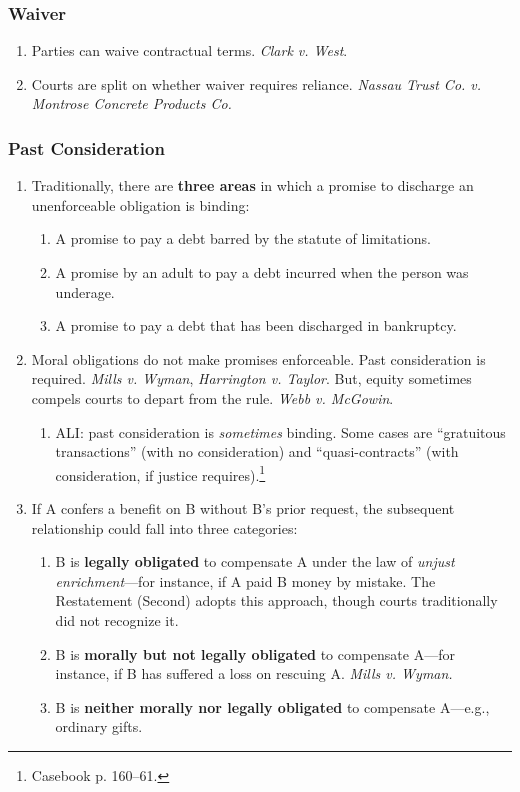 \subsubsection{Waiver}

\begin{enumerate}
    \item Parties can waive contractual terms. \emph{Clark v. West}.
    \item Courts are split on whether waiver requires reliance. \emph{Nassau 
    Trust Co. v. Montrose Concrete Products Co.}
\end{enumerate}

\subsubsection{Past Consideration}

\begin{enumerate}
    \item Traditionally, there are \textbf{three areas} in which a promise to 
    discharge an unenforceable obligation is binding:
    \begin{enumerate}
        \item A promise to pay a debt barred by the statute of limitations.
        \item A promise by an adult to pay a debt incurred when the person was 
        underage.
        \item A promise to pay a debt that has been discharged in bankruptcy.
    \end{enumerate}
    \item Moral obligations do not make promises enforceable. Past 
    consideration is required. \emph{Mills v. Wyman}, \emph{Harrington v. 
    Taylor}. But, equity sometimes compels courts to depart from the rule. 
    \emph{Webb v. McGowin}.
    \begin{enumerate}
        \item ALI: past consideration is \emph{sometimes} binding. Some cases 
        are ``gratuitous transactions'' (with no consideration) and 
        ``quasi-contracts'' (with consideration, if justice 
        requires).\footnote{Casebook p. 160--61.}
    \end{enumerate}
    \item If A confers a benefit on B without B's prior request, the 
    subsequent relationship could fall into three categories:
    \begin{enumerate}
        \item B is \textbf{legally obligated} to compensate A under the law of 
        \emph{unjust enrichment}---for instance, if A paid B money by mistake. 
        The Restatement (Second) adopts this approach, though courts 
        traditionally did not recognize it.
        \item B is \textbf{morally but not legally obligated} to compensate 
        A---for instance, if B has suffered a loss on rescuing A. \emph{Mills 
        v. Wyman.}
        \item B is \textbf{neither morally nor legally obligated} to 
        compensate A---e.g., ordinary gifts.
    \end{enumerate}
\end{enumerate}

